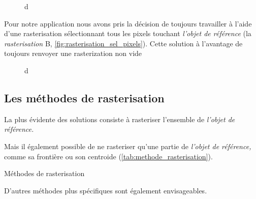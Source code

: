 \begin{figure}
  \centering
  
  \caption{d}
  \label{fig:rasterisation_sel_pixels}
\end{figure}
    
Pour notre application nous avons pris la décision de toujours travailler à l'aide d'une rasterisation sélectionnant tous les pixels touchant \emph{l'objet de référence} (\eg la \emph{rasterisation} \textcolor{RdBu-9-9}{\textsf{B}}, \autoref{fig:rasterisation_sel_pixels}). Cette solution à l’avantage de toujours renvoyer une rasterization non vide 

\begin{figure}
  \centering
  
  \caption{d}
  \label{fig:rasterisation_cas_limite}
\end{figure}

\subsection{Les méthodes de rasterisation}



La plus évidente des solutions consiste à rasteriser l'ensemble de
\emph{l'objet de référence.}


Mais il également possible de ne rasteriser qu'une partie de
\emph{l'objet de référence,} comme sa frontière ou son centroide
(\autoref{tab:methode_rasterisation}).

\begin{table}
  \centering
  
  \caption{Méthodes de rasterisation}
  \label{tab:methode_rasterisation}
\end{table}


D'autres méthodes plus spécifiques sont également envisageables.

